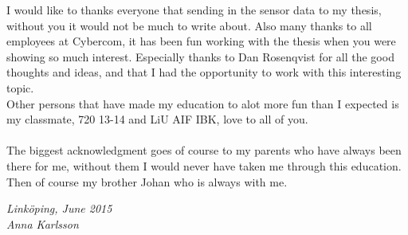 \begin{acknowledgments}
I would like to thanks everyone that sending in the sensor data to my thesis, without you it would not be much to write about. Also many thanks to all employees at Cybercom, it has been fun working with the thesis when you were showing so much interest. Especially thanks to Dan Rosenqvist for all the good thoughts and ideas, and that I had the opportunity to work with this interesting topic. %
\\
Other persons that have made my education to alot more fun than I expected is my classmate, 720 13-14 and LiU AIF IBK, love to all of you.\\
\\
The biggest acknowledgment goes of course to my parents who have always been there for me, without them I would never have taken me through this education. Then of course my brother Johan who is always with me.\\



  \addvspace{1em}
  \begin{flushright}
    \textit{%
      Linköping, June 2015\\
      Anna Karlsson%
    }
  \end{flushright}
\end{acknowledgments}
